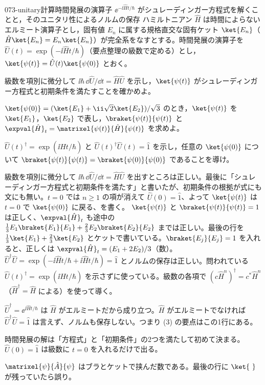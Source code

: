 \documentclass[uplatex,dvipdfmx,a4paper,11pt]{jsarticle}
\begin{document}
\mondaihen
{}
\begin{mondai}{073-unitary}{計算}{時間発展の演算子 $\ee^{-\ii\hat{H}t/\hbar}$ がシュレーディンガー方程式を解くことと，そのユニタリ性によるノルムの保存}
ハミルトニアン $\hat{H}$ は時間によらないエルミート演算子とし，固有値 $E_{n}$ に属する規格直交な固有ケット $\ket{E_{n}}$（$\hat{H}\ket{E_{n}}=E_{n}\ket{E_{n}}$）が完全系をなすとする。時間発展の演算子を $\hat{U}(t)=\exp(-\ii\hat{H}t/\hbar)$（要点整理の級数で定める）とし，$\ket{\psi(t)}=\hat{U}(t)\ket{\psi(0)}$ とおく。
  \begin{shoumon}
    \item 級数を項別に微分して $\ii\hbar\,\dd\hat{U}/\dd t=\hat{H}\hat{U}$ を示し，$\ket{\psi(t)}$ がシュレーディンガー方程式と初期条件を満たすことを確かめよ。
    \item $\ket{\psi(0)}=(\ket{E_{1}}+\ii\sqrt{2}\ket{E_{2}})/\sqrt{3}$ のとき，$\ket{\psi(t)}$ を $\ket{E_{1}}$，$\ket{E_{2}}$ で表し，$\braket{\psi(t)}{\psi(t)}$ と $\expval{\hat{H}}_{t}=\matrixel{\psi(t)}{\hat{H}}{\psi(t)}$ を求めよ。
    \item $\hat{U}(t)^{\dagger}=\exp(\ii\hat{H}t/\hbar)$ と $\hat{U}(t)^{\dagger}\hat{U}(t)=\hat{1}$ を示し，任意の $\ket{\psi(0)}$ について $\braket{\psi(t)}{\psi(t)}=\braket{\psi(0)}{\psi(0)}$ であることを導け。
  \end{shoumon}

\begin{kotaeran}
   級数を項別に微分して $\ii\hbar\,\dd\hat{U}/\dd t=\hat{H}\hat{U}$ を出すところは正しい。最後に「シュレーディンガー方程式と初期条件を満たす」と書いたが、初期条件の根拠が式にも文にも無い。$t=0$ では $n\ge1$ の項が消えて $\hat{U}(0)=\hat{1}$、よって $\ket{\psi(t)}$ は $t=0$ で $\ket{\psi(0)}$ に戻る、を書く。
   $\ket{\psi(t)}$ と $\braket{\psi(t)}{\psi(t)}=1$ は正しく、$\expval{\hat{H}}_{t}$ も途中の $\frac{1}{3}E_{1}\braket{E_{1}}{E_{1}}+\frac{2}{3}E_{2}\braket{E_{2}}{E_{2}}$ までは正しい。最後の行を $\frac{1}{3}\ket{E_{1}}+\frac{2}{3}\ket{E_{2}}$ とケットで書いている。$\braket{E_{j}}{E_{j}}=1$ を入れると、正しくは $\expval{\hat{H}}_{t}=(E_{1}+2E_{2})/3$（数）。
   $\hat{U}^{\dagger}\hat{U}=\exp(-\ii\hat{H}t/\hbar+\ii\hat{H}t/\hbar)=\hat{1}$ とノルムの保存は正しい。問われている $\hat{U}(t)^{\dagger}=\exp(\ii\hat{H}t/\hbar)$ を示さずに使っている。級数の各項で $(c\hat{H}^{n})^{\dagger}=c^{*}\hat{H}^{n}$（$\hat{H}^{\dagger}=\hat{H}$ による）を使って導く。
\end{kotaeran}
\begin{rikai}
  \item $\hat{U}^{\dagger}=\ee^{\ii\hat{H}t/\hbar}$ は $\hat{H}$ がエルミートだから成り立つ。$\hat{H}$ がエルミートでなければ $\hat{U}^{\dagger}\hat{U}=\hat{1}$ は言えず、ノルムも保存しない。つまり (3) の要点はこの1行にある。
  \item 時間発展の解は「方程式」と「初期条件」の2つを満たして初めて決まる。$\hat{U}(0)=\hat{1}$ は級数に $t=0$ を入れるだけで出る。
  \item $\matrixel{\psi}{\hat{A}}{\psi}$ はブラとケットで挟んだ数である。最後の行に $\ket{\ }$ が残っていたら誤り。
\end{rikai}
\end{mondai}
\end{document}
